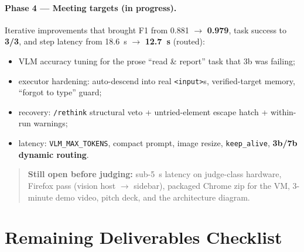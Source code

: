 \documentclass[11pt,a4paper]{article}
\newcommand{\code}[1]{\texttt{#1}}
\begin{document}
\paragraph{Phase 4 --- Meeting targets (in progress).}
Iterative improvements that brought F1 from 0.881 $\rightarrow$ \textbf{0.979}, task success to \textbf{3/3}, and step latency from 18.6~s $\rightarrow$ \textbf{12.7~s} (routed):
\begin{itemize}
  \item VLM accuracy tuning for the prose ``read \& report'' task that 3b was failing;
  \item executor hardening: auto-descend into real \code{<input>}s, verified-target memory, ``forgot to type'' guard;
  \item recovery: \code{/rethink} structural veto + untried-element escape hatch + within-run warnings;
  \item latency: \code{VLM\_MAX\_TOKENS}, compact prompt, image resize, \code{keep\_alive}, \textbf{3b/7b dynamic routing}.
\end{itemize}

\begin{quote}
\textbf{Still open before judging:} sub-5~s latency on judge-class hardware, Firefox pass (vision host $\rightarrow$ sidebar), packaged Chrome zip for the VM, 3-minute demo video, pitch deck, and the architecture diagram.
\end{quote}

\section{Remaining Deliverables Checklist}
\end{document}
